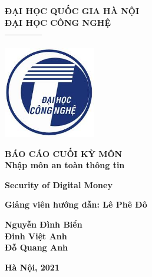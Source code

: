 \documentclass[./main.tex]{subfiles}
\begin{document}
\begin{titlepage}	
	\begin{center}
		\textbf{ĐẠI HỌC QUỐC GIA HÀ NỘI}\\
		\textbf{ĐẠI HỌC CÔNG NGHỆ}\\
		--------------
	
		\vspace*{30pt}
		
		\includegraphics[width=0.3\textwidth]{./images/uet.jpg}
		
		\vspace*{50pt}
		
		\textbf{BÁO CÁO CUỐI KỲ MÔN 
			\\ Nhập môn an toàn thông tin}
		\vspace*{30pt}
		
		\textbf{Security of Digital Money\\}

		\vspace*{50pt}
		
		\textbf{Giảng viên hướng dẫn: Lê Phê Đô}
		
		\vspace*{30pt}
		
		\textbf{Nguyễn Đình Biển\\
				Đinh Việt Anh \\
				Đỗ Quang Anh \\
		}
		
		\vspace*{40pt}
	\end{center}
	
	
	\begin{center}
		\textbf{Hà Nội, 2021}
	\end{center}
\end{titlepage}
\end{document}
